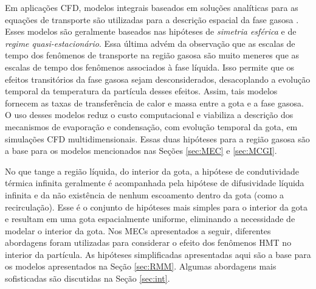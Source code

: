 Em aplicações CFD, modelos integrais baseados em soluções analíticas para as equações de transporte são utilizadas para a descrição espacial da fase gasosa \cite{Sazhin2006}.
Esses modelos são geralmente baseados nas hipóteses de \emph{simetria esférica} e de \emph{regime quasi-estacionário}.
Essa última advém da observação que as escalas de tempo dos fenômenos de transporte na região gasosa são muito meneres que as escalas de tempo dos fenômenos associados à fase líquida. Isso permite que os efeitos transitórios da fase gasosa sejam desconsiderados, desacoplando a evolução temporal da temperatura da partícula desses efeitos. 
Assim, tais modelos fornecem as taxas de transferência de calor e massa entre a gota e a fase gasosa.
O uso desses modelos reduz o custo computacional e viabiliza a descrição dos mecanismos de evaporação e condensação, com evolução temporal da gota, em simulações CFD multidimensionais.
Essas duas hipóteses para a região gasosa são a base para os modelos mencionados nas Seções \ref{sec:MEC} e \ref{sec:MCGI}.





No que tange a região líquida, do interior da gota, a hipótese de condutividade térmica infinita geralmente é acompanhada pela hipótese de difusividade líquida infinita e da não existência de nenhum escoamento dentro da gota (como a recirculação).
Esse é o conjunto de hipóteses mais simples para o interior da gota e resultam em uma gota espacialmente uniforme, eliminando a necessidade de modelar o interior da gota.
Nos MECs apresentados a seguir, diferentes abordagens foram utilizadas para considerar o efeito dos fenômenos HMT no interior da partícula.
As hipóteses simplificadas apresentadas aqui são a base para os modelos apresentados na Seção \ref{sec:RMM}.
Algumas abordagens mais sofisticadas são discutidas na Seção \ref{sec:int}.






